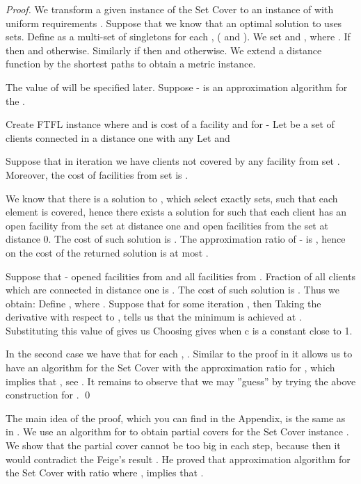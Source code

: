 \documentclass{llncs}
\begin{document}
\begin{proof}
 We transform a given instance of the Set Cover  to an instance of  with uniform requirements . Suppose that we know that an optimal solution to  uses  sets. Define  as a multi-set of singletons  for each , ( and ). We set  and , where . If  then  and  otherwise. Similarly if  then  and  otherwise. We extend a distance function  by the shortest paths to obtain a metric instance. 
 
 The value of  will be specified later. Suppose - is an  approximation algorithm for the .
\begin{algorithm}
  \caption{}
\begin{algorithmic}[1]
 \STATE Create FTFL instance  where  and 
 \STATE  is cost of a facility  and  for 
 \WHILE{}
  \STATE -
  \STATE Let  be a set of clients connected in a distance one with any 
  \STATE Let  and 
  \FORALL{}
    \STATE 
  \ENDFOR
 \ENDWHILE
\end{algorithmic} 
\end{algorithm}
 Suppose that in iteration  we have  clients not covered by any facility from set . Moreover, the cost of facilities from set  is . 
 
 We know that there is a solution to , which select exactly  sets, such that each element is covered, hence there exists a solution for  such that each client has an open facility from the set  at distance one and  open facilities from the set  at distance 0. The cost of such solution is . The approximation ratio of - is , hence on the cost of the returned solution is at most . 
 
 Suppose that - opened  facilities from  and all facilities from . Fraction of all clients which are connected in distance one is . The cost of such solution is . Thus we obtain:  Define , where . Suppose that for some iteration ,  then  Taking the derivative with respect to  , tells us that the minimum is achieved at . Substituting this value of  gives us  Choosing  gives  when c is a constant close to 1.
 
 In the second case we have that for each , . Similar to the proof in \cite{Guha} it allows us to have an algorithm for the Set Cover with the approximation ratio  for , which implies that , see \cite{Feige}. It remains to observe that we may ''guess''  by trying the above construction for .
 \qed
\end{proof}

The main idea of the proof, which you can find in the Appendix, is the same as in \cite{Guha}. We use an algorithm for  to obtain partial covers for the Set Cover instance . We show that the partial cover cannot be too big in each step, because then it would contradict the Feige’s result \cite{Feige}. He proved that approximation algorithm for the Set Cover with ratio  where , implies that .
\end{document}
